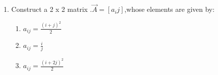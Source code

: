 \renewcommand{\theequation}{\theenumi}
\begin{enumerate}[label=\arabic*.,ref=\thesubsection.\theenumi]
\item Construct a 2 x 2 matrix .$\vec A = \left[a_ij\right]$,whose elements  are given by:
\begin{enumerate}
	\item $a_{ij} = \frac{(i+j)^2}{2}$
	\\
	\item $a_{ij} = \frac{i}{j}$
	\\
	\item $a_{ij} = \frac{(i+2j)^2}{2}$
\end{enumerate}


\end{enumerate}